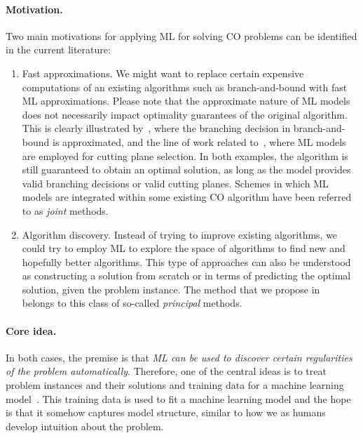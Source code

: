 \documentclass{report}
\theoremstyle{definition}
\theoremstyle{plain}
\begin{document}
\paragraph{Motivation.}
Two main motivations for applying ML for solving CO problems can be identified
in the current literature:

\begin{enumerate}
  \item{Fast approximations.} We might want to replace certain expensive
        computations of an existing algorithms such as branch-and-bound with
        fast ML approximations.
        Please note that the approximate nature of ML models does not
        necessarily impact optimality guarantees of the original algorithm.
        This is clearly illustrated by~\cite{gasseExactCombinatorialOptimization2019}, where the branching decision
        in branch-and-bound is approximated, and the line of work related
        to~\cite{tangReinforcementLearningInteger2020}, where ML models are employed for cutting plane selection.
        In both examples, the algorithm is still guaranteed to obtain an optimal
        solution, as long as the model provides valid branching decisions or
        valid cutting planes.
        Schemes in which ML models are integrated within some existing CO
        algorithm have been referred to as \emph{joint} methods.

  \item{Algorithm discovery.} Instead of trying to improve existing algorithms,
        we could try to employ ML to explore the space of algorithms to find
        new and hopefully better algorithms.
        This type of approaches can also be understood as constructing a
        solution from scratch or in terms of predicting the optimal solution,
        given the problem instance.
        The method that we propose in~ belongs to this class of
        so-called \emph{principal} methods.
\end{enumerate}

\paragraph{Core idea.}
In both cases, the premise is that \emph{ML can be used to discover certain
  regularities of the problem automatically}.
%
Therefore, one of the central ideas is to treat problem instances and their
solutions and training data for a machine learning model~\cite{bengioMachineLearningCombinatorial2020}.
%
This training data is used to fit a machine learning model and the hope is that
it somehow captures model structure, similar to how we as humans develop
intuition about the problem.
\end{document}
